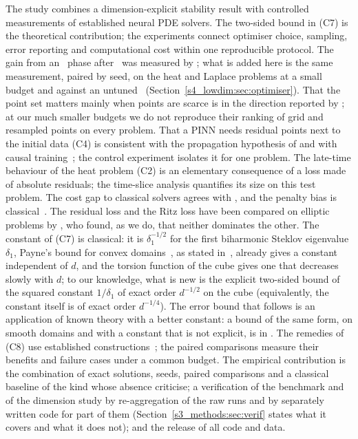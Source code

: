 The study combines a dimension-explicit stability result with controlled measurements of
established neural PDE solvers. The two-sided bound in (C7) is the theoretical contribution;
the experiments connect optimiser choice, sampling, error reporting and computational cost
within one reproducible protocol.
The gain from an \LBFGS\ phase after \Adam\ was measured by \citet{rathore2024}; what is
added here is the same measurement, paired by seed, on the heat and Laplace problems at a
small budget and against an untuned \Adam\ (Section~\ref{s4_lowdim:sec:optimiser}).
That the point set matters mainly when points are scarce is in the direction reported by
\citet{wu2023}; at our much smaller budgets we do not reproduce their ranking of grid and
resampled points on every problem. That a PINN needs residual points next to the initial
data (C4) is consistent with the propagation hypothesis of \citet{daw2023} and with causal
training~\citep{wangsankaran2024}; the control experiment isolates it for one problem. The
late-time behaviour of the heat problem (C2) is an elementary consequence of a loss made of
absolute residuals; the time-slice analysis quantifies its size on this test problem. The cost gap to classical solvers agrees with \citet{grossmann2024}, and
the penalty bias is classical~\citep{babuska1973,muller2022}. The residual loss and the Ritz
loss have been compared on elliptic problems by \citet{chen2020comparison}, who found, as we
do, that neither dominates the other. The constant of (C7) is classical: it is
$\delta_1^{-1/2}$ for the first biharmonic Steklov eigenvalue $\delta_1$, Payne's bound for
convex domains~\citep{payne1968bounds}, as stated in~\citet[Lemma~5.3]{bucur2011first}, already
gives a constant independent of $d$, and the torsion function of the cube gives one that
decreases slowly with $d$; to our knowledge, what is new is the explicit two-sided bound of
the squared constant $1/\delta_1$ of exact order $d^{-1/2}$ on the cube (equivalently, the
constant itself is of exact order $d^{-1/4}$). The error bound that
follows is an application of known theory with a better constant: a bound of the same form,
on smooth domains and with a constant that is not explicit, is in
\citet[App.~B]{shin2023error}. The remedies of (C8) use established
constructions~\citep{lagaris1998,ainsworth2021galerkin,chang2022horderdnn,zhang2025khorderdnn};
the paired comparisons measure their benefits and failure cases under a common budget.
The empirical contribution is the combination of
exact solutions, seeds, paired comparisons and a classical baseline of the kind whose
absence \citet{mcgreivy2024} criticise; a verification of the benchmark and of the dimension
study by re-aggregation of the raw runs and by separately written code for part of them
(Section~\ref{s3_methods:sec:verif} states what it covers and what it does not); and the
release of all code and data.

